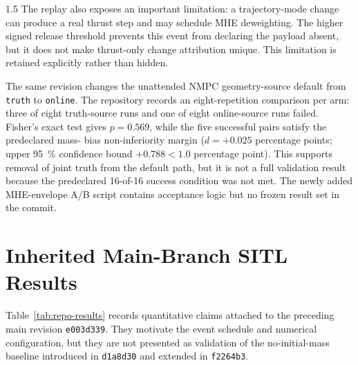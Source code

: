 \begin{spacing}{1.5}
The replay also exposes an important limitation: a trajectory-mode change
can produce a real thrust step and may schedule MHE deweighting. The
higher signed release threshold prevents this event from declaring the
payload absent, but it does not make thrust-only change attribution
unique. This limitation is retained explicitly rather than hidden.

The same revision changes the unattended NMPC geometry-source default
from \texttt{truth} to \texttt{online}. The repository records an
eight-repetition comparison per arm: three of eight truth-source runs and
one of eight online-source runs failed. Fisher's exact test gives
$p=0.569$, while the five successful pairs satisfy the predeclared mass-
bias non-inferiority margin ($d=+0.025$ percentage points; upper
\SI{95}{\percent} confidence bound $+0.788<1.0$ percentage point). This
supports removal of joint truth from the default path, but it is not a
full validation result because the predeclared 16-of-16 success condition
was not met. The newly added MHE-envelope A/B script contains acceptance
logic but no frozen result set in the commit.


\section{Inherited Main-Branch SITL Results}

Table~\ref{tab:repo-results} records quantitative claims attached to the
preceding main revision \texttt{e003d339}. They motivate the event
schedule and numerical configuration, but they are not presented as
validation of the no-initial-mass baseline introduced in
\texttt{d1a8d30} and extended in \texttt{f2264b3}.


\end{spacing}
